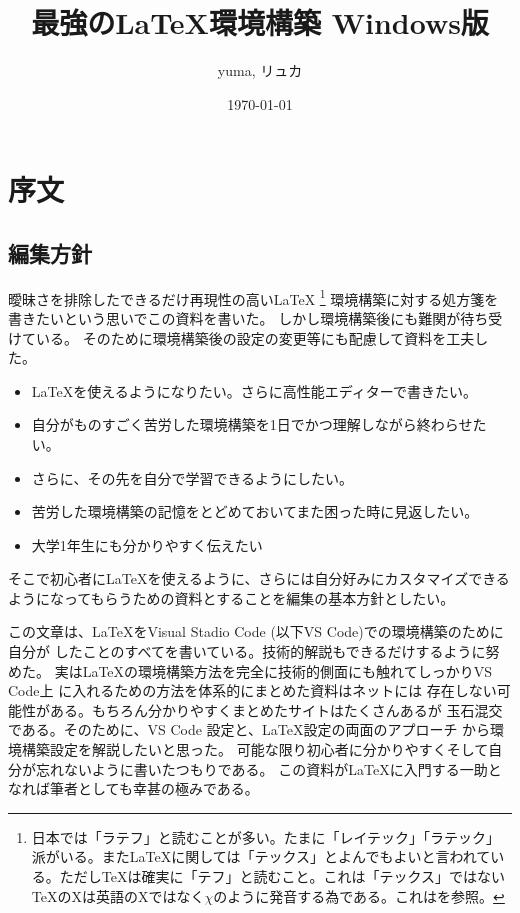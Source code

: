 \documentclass[titlepage]{ltjsarticle}
\begin{document}
\title{最強の\LaTeX 環境構築 Windows版}
\author{yuma, リュカ}
\date{\today}
\maketitle
\section{序文}
\subsection{編集方針}

曖昧さを排除したできるだけ再現性の高い\LaTeX \index{\LaTeX}
\footnote{日本では「ラテフ」と読むことが多い。たまに「レイテック」「ラテック」派がいる。また\LaTeX に関しては「テックス」とよんでもよいと言われている。ただし\TeX は確実に「テフ」と読むこと。これは「テックス」ではない\TeX のXは英語のXではなく\(\chi\)のように発音する為である。これは\cite{TeXの発音について}を参照。}
環境構築に対する処方箋を書きたいという思いでこの資料を書いた。
しかし環境構築後にも難関が待ち受けている。
そのために環境構築後の設定の変更等にも配慮して資料を工夫した。
\begin{itemize}
  \item \LaTeX を使えるようになりたい。さらに高性能エディターで書きたい。
  \item 自分がものすごく苦労した環境構築を1日でかつ理解しながら終わらせたい。
  \item さらに、その先を自分で学習できるようにしたい。
  \item 苦労した環境構築の記憶をとどめておいてまた困った時に見返したい。
  \item 大学1年生にも分かりやすく伝えたい
\end{itemize}
そこで初心者に\LaTeX を使えるように、さらには自分好みにカスタマイズできるようになってもらうための資料とすることを編集の基本方針としたい。

この文章は、\LaTeX をVisual Stadio Code (以下VS Code)での環境構築のために自分が
したことのすべてを書いている。技術的解説もできるだけするように努めた。
実は\LaTeX の環境構築方法を完全に技術的側面にも触れてしっかりVS Code上
に入れるための方法を体系的にまとめた資料はネットには
存在しない可能性がある。もちろん分かりやすくまとめたサイトはたくさんあるが
玉石混交である。そのために、VS Code 設定と、\LaTeX 設定の両面のアプローチ
から環境構築設定を解説したいと思った。
可能な限り初心者に分かりやすくそして自分が忘れないように書いたつもりである。
この資料が\LaTeX に入門する一助となれば筆者としても幸甚の極みである。
\end{document}
